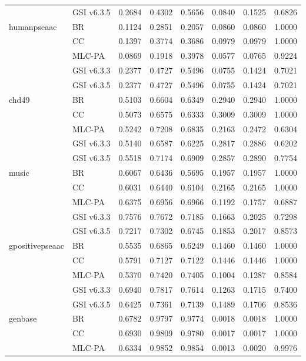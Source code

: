 \documentclass[11pt,a4paper,twoside]{article}
\begin{document}
\begin{landscape}
\begin{longtable}{llrrrrrr}
 & GSI v6.3.5 & 0.2684 & 0.4302 & 0.5656 & 0.0840 & 0.1525 & 0.6826 \\
\addlinespace[2pt]
humanpseaac & BR & 0.1124 & 0.2851 & 0.2057 & 0.0860 & 0.0860 & 1.0000 \\
 & CC & 0.1397 & 0.3774 & 0.3686 & 0.0979 & 0.0979 & 1.0000 \\
 & MLC-PA & 0.0869 & 0.1918 & 0.3978 & 0.0577 & 0.0765 & 0.9224 \\
 & GSI v6.3.3 & 0.2377 & 0.4727 & 0.5496 & 0.0755 & 0.1424 & 0.7021 \\
 & GSI v6.3.5 & 0.2377 & 0.4727 & 0.5496 & 0.0755 & 0.1424 & 0.7021 \\
\addlinespace[2pt]
chd49 & BR & 0.5103 & 0.6604 & 0.6349 & 0.2940 & 0.2940 & 1.0000 \\
 & CC & 0.5073 & 0.6575 & 0.6333 & 0.3009 & 0.3009 & 1.0000 \\
 & MLC-PA & 0.5242 & 0.7208 & 0.6835 & 0.2163 & 0.2472 & 0.6304 \\
 & GSI v6.3.3 & 0.5140 & 0.6587 & 0.6225 & 0.2817 & 0.2886 & 0.6202 \\
 & GSI v6.3.5 & 0.5518 & 0.7174 & 0.6909 & 0.2857 & 0.2890 & 0.7754 \\
\addlinespace[2pt]
music & BR & 0.6067 & 0.6436 & 0.5695 & 0.1957 & 0.1957 & 1.0000 \\
 & CC & 0.6031 & 0.6440 & 0.6104 & 0.2165 & 0.2165 & 1.0000 \\
 & MLC-PA & 0.6375 & 0.6956 & 0.6966 & 0.1192 & 0.1757 & 0.6887 \\
 & GSI v6.3.3 & 0.7576 & 0.7672 & 0.7185 & 0.1663 & 0.2025 & 0.7298 \\
 & GSI v6.3.5 & 0.7217 & 0.7302 & 0.6745 & 0.1853 & 0.2017 & 0.8573 \\
\addlinespace[2pt]
gpositivepseaac & BR & 0.5535 & 0.6865 & 0.6249 & 0.1460 & 0.1460 & 1.0000 \\
 & CC & 0.5791 & 0.7127 & 0.7122 & 0.1446 & 0.1446 & 1.0000 \\
 & MLC-PA & 0.5370 & 0.7420 & 0.7405 & 0.1004 & 0.1287 & 0.8584 \\
 & GSI v6.3.3 & 0.6940 & 0.7817 & 0.7614 & 0.1263 & 0.1715 & 0.7400 \\
 & GSI v6.3.5 & 0.6425 & 0.7361 & 0.7139 & 0.1489 & 0.1706 & 0.8536 \\
\addlinespace[2pt]
genbase & BR & 0.6782 & 0.9797 & 0.9774 & 0.0018 & 0.0018 & 1.0000 \\
 & CC & 0.6930 & 0.9809 & 0.9780 & 0.0017 & 0.0017 & 1.0000 \\
 & MLC-PA & 0.6334 & 0.9852 & 0.9854 & 0.0013 & 0.0020 & 0.9976 \\

\end{longtable}
\end{landscape}
\end{document}
